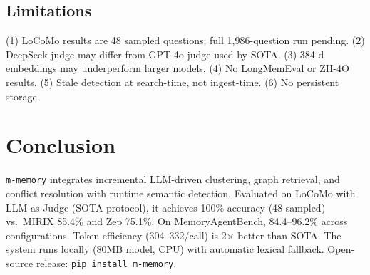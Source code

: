 \documentclass{article}
\theoremstyle{plain}\newtheorem{theorem}{Theorem}[section]
\theoremstyle{definition}\newtheorem{definition}[theorem]{Definition}
\newcommand{\mmemory}{\texttt{m-memory}\xspace}
\newcommand{\MAB}{MemoryAgentBench\xspace}
\begin{document}
\subsection{Limitations}

(1) LoCoMo results are 48 sampled questions; full 1,986-question run pending.
(2) DeepSeek judge may differ from GPT-4o judge used by SOTA. (3) 384-d embeddings
may underperform larger models. (4) No LongMemEval or ZH-4O results. (5) Stale
detection at search-time, not ingest-time. (6) No persistent storage.

\section{Conclusion}

\mmemory{} integrates incremental LLM-driven clustering, graph retrieval, and
conflict resolution with runtime semantic detection. Evaluated on LoCoMo with
LLM-as-Judge (SOTA protocol), it achieves 100\% accuracy (48 sampled) vs.\ MIRIX
85.4\% and Zep 75.1\%. On \MAB{}, 84.4--96.2\% across configurations. Token
efficiency (304--332/call) is 2$\times$ better than SOTA. The system runs locally
(80MB model, CPU) with automatic lexical fallback. Open-source release:
\texttt{pip install m-memory}.



\end{document}
